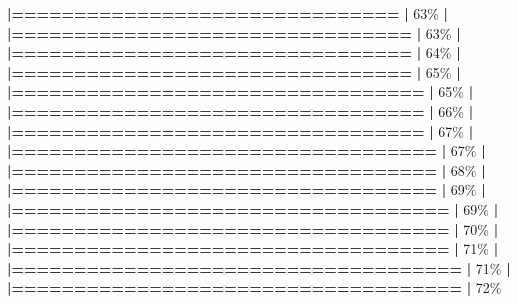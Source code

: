 \documentclass[
]{book}
\newenvironment{Shaded}{\begin{snugshade}}{\end{snugshade}}
\newcommand{\DecValTok}[1]{\textcolor[rgb]{0.00,0.00,0.81}{#1}}
\newcommand{\ErrorTok}[1]{\textcolor[rgb]{0.64,0.00,0.00}{\textbf{#1}}}
\newcommand{\NormalTok}[1]{#1}
\newcommand{\SpecialCharTok}[1]{\textcolor[rgb]{0.81,0.36,0.00}{\textbf{#1}}}
\begin{document}
\begin{Shaded}
\begin{Highlighting}[]
  \ErrorTok{|===============================}                   \ErrorTok{|}  \DecValTok{63}\NormalTok{\%}
  \SpecialCharTok{|}                                                        
  \ErrorTok{|================================}                  \ErrorTok{|}  \DecValTok{63}\NormalTok{\%}
  \SpecialCharTok{|}                                                        
  \ErrorTok{|================================}                  \ErrorTok{|}  \DecValTok{64}\NormalTok{\%}
  \SpecialCharTok{|}                                                        
  \ErrorTok{|================================}                  \ErrorTok{|}  \DecValTok{65}\NormalTok{\%}
  \SpecialCharTok{|}                                                        
  \ErrorTok{|=================================}                 \ErrorTok{|}  \DecValTok{65}\NormalTok{\%}
  \SpecialCharTok{|}                                                        
  \ErrorTok{|=================================}                 \ErrorTok{|}  \DecValTok{66}\NormalTok{\%}
  \SpecialCharTok{|}                                                        
  \ErrorTok{|=================================}                 \ErrorTok{|}  \DecValTok{67}\NormalTok{\%}
  \SpecialCharTok{|}                                                        
  \ErrorTok{|==================================}                \ErrorTok{|}  \DecValTok{67}\NormalTok{\%}
  \SpecialCharTok{|}                                                        
  \ErrorTok{|==================================}                \ErrorTok{|}  \DecValTok{68}\NormalTok{\%}
  \SpecialCharTok{|}                                                        
  \ErrorTok{|==================================}                \ErrorTok{|}  \DecValTok{69}\NormalTok{\%}
  \SpecialCharTok{|}                                                        
  \ErrorTok{|===================================}               \ErrorTok{|}  \DecValTok{69}\NormalTok{\%}
  \SpecialCharTok{|}                                                        
  \ErrorTok{|===================================}               \ErrorTok{|}  \DecValTok{70}\NormalTok{\%}
  \SpecialCharTok{|}                                                        
  \ErrorTok{|===================================}               \ErrorTok{|}  \DecValTok{71}\NormalTok{\%}
  \SpecialCharTok{|}                                                        
  \ErrorTok{|====================================}              \ErrorTok{|}  \DecValTok{71}\NormalTok{\%}
  \SpecialCharTok{|}                                                        
  \ErrorTok{|====================================}              \ErrorTok{|}  \DecValTok{72}\NormalTok{\%}

\end{Highlighting}
\end{Shaded}
\end{document}
